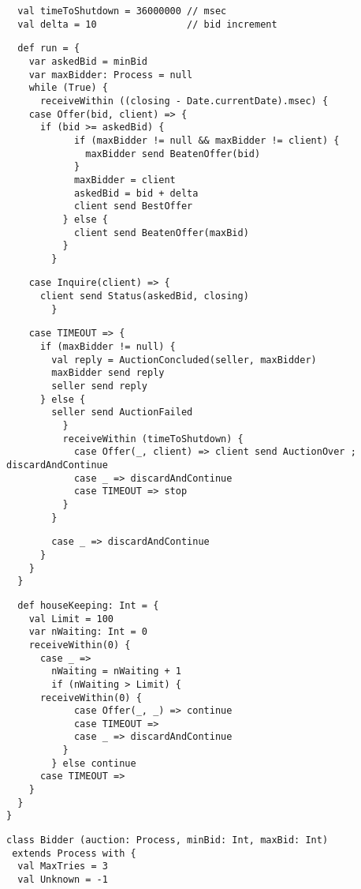 \documentclass[11pt]{report}
\begin{document}
{\begin{verbatim}
  val timeToShutdown = 36000000 // msec
  val delta = 10                // bid increment
\end{verbatim}
\begin{verbatim}
  def run = {
    var askedBid = minBid
    var maxBidder: Process = null
    while (True) {
      receiveWithin ((closing - Date.currentDate).msec) {
	case Offer(bid, client) => {
	  if (bid >= askedBid) {
            if (maxBidder != null && maxBidder != client) {
              maxBidder send BeatenOffer(bid)
            }
            maxBidder = client
            askedBid = bid + delta
            client send BestOffer
          } else {
            client send BeatenOffer(maxBid)
          }
        }
\end{verbatim}
\begin{verbatim}
	case Inquire(client) => {
	  client send Status(askedBid, closing)
        }
\end{verbatim}
\begin{verbatim}
	case TIMEOUT => {
	  if (maxBidder != null) {
	    val reply = AuctionConcluded(seller, maxBidder)
	    maxBidder send reply
	    seller send reply
	  } else {
	    seller send AuctionFailed
          }
          receiveWithin (timeToShutdown) {
            case Offer(_, client) => client send AuctionOver ; discardAndContinue
            case _ => discardAndContinue
            case TIMEOUT => stop
          }
        }
\end{verbatim}
\begin{verbatim}
        case _ => discardAndContinue
      }
    }
  }
\end{verbatim}
\begin{verbatim}
  def houseKeeping: Int = {
    val Limit = 100
    var nWaiting: Int = 0
    receiveWithin(0) {
      case _ =>
        nWaiting = nWaiting + 1
        if (nWaiting > Limit) {
	  receiveWithin(0) {
            case Offer(_, _) => continue
            case TIMEOUT =>
            case _ => discardAndContinue
          }
        } else continue
      case TIMEOUT =>
    }
  }
}
\end{verbatim}
\begin{verbatim}
class Bidder (auction: Process, minBid: Int, maxBid: Int)
 extends Process with {
  val MaxTries = 3
  val Unknown = -1


\end{verbatim}}
\end{document}
